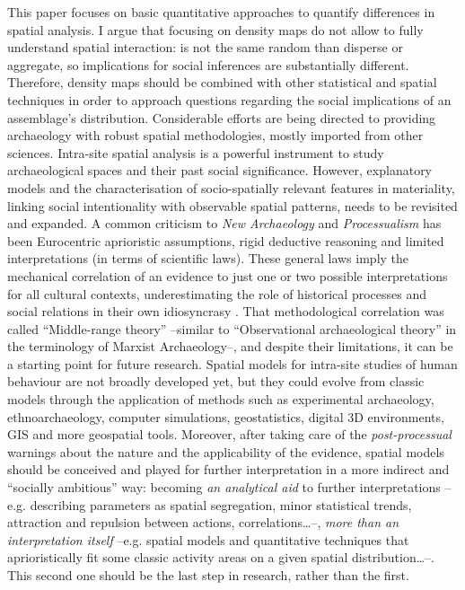 This paper focuses on basic quantitative approaches to quantify differences in spatial analysis. I argue that focusing on density maps do not allow to fully understand spatial interaction: is not the same random than disperse or aggregate, so implications for social inferences are substantially different. Therefore, density maps should be combined with other statistical and spatial techniques in order to approach questions regarding the social implications of an assemblage’s distribution. Considerable efforts are being directed to providing archaeology with robust spatial methodologies, mostly imported from other sciences. Intra-site spatial analysis is a powerful instrument to study archaeological spaces and their past social significance. However, explanatory models and the characterisation of socio-spatially relevant features in materiality, linking social intentionality with observable spatial patterns, needs to be revisited and expanded. A common criticism to \emph{New Archaeology} and \emph{Processualism} has been Eurocentric aprioristic assumptions, rigid deductive reasoning and limited interpretations (in terms of scientific laws). These general laws imply the mechanical correlation of an evidence to just one or two possible interpretations for all cultural contexts, underestimating the role of historical processes and social relations in their own idiosyncrasy \parencites{Hodder_2003}{Trigger_2006}. That methodological correlation was called “Middle-range theory” –similar to “Observational archaeological theory” in the terminology of Marxist Archaeology–, and despite their limitations, it can be a starting point for future research. Spatial models for intra-site studies of human behaviour are not broadly developed yet, but they could evolve from classic models through the application of methods such as experimental archaeology, ethnoarchaeology, computer simulations, geostatistics, digital 3D environments, GIS and more geospatial tools. Moreover, after taking care of the \emph{post-processual} warnings about the nature and the applicability of the evidence, spatial models should be conceived and played for further interpretation in a more indirect and “socially ambitious” way: becoming \emph{an analytical aid} to further interpretations –e.g. describing parameters as spatial segregation, minor statistical trends, attraction and repulsion between actions, correlations…–, \emph{more than an interpretation itself} –e.g. spatial models and quantitative techniques that aprioristically fit some classic activity areas on a given spatial distribution…–. This second one should be the last step in research, rather than the first.


